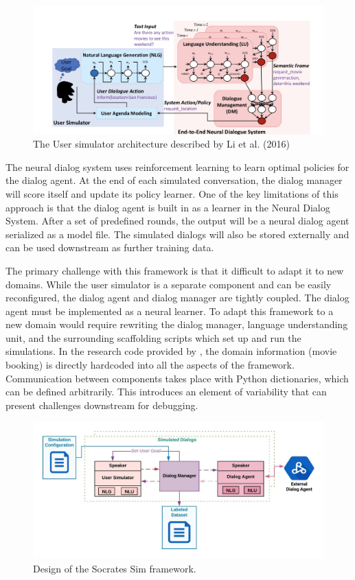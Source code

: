 \begin{figure}[h!]
	\label{fig:li_end_end}
	\includegraphics[width=\linewidth]{diagrams/li_end_to_end.jpeg}
	\caption{ The User simulator architecture described by Li et al. (2016) }
\end{figure}

The neural dialog system uses reinforcement learning to learn optimal policies for the dialog agent. At the end of each simulated conversation, the dialog manager will score itself and update its policy learner. One of the key limitations of this approach is that the dialog agent is built in as a learner in the Neural Dialog System. After a set of predefined rounds, the output will be a neural dialog agent serialized as a model file. The simulated dialogs will also be stored externally and can be used downstream as further training data.

The primary challenge with this framework is that it difficult to adapt it to new domains. While the user simulator is a separate component and can be easily reconfigured, the dialog agent and dialog manager are tightly coupled. The dialog agent must be implemented as a neural learner. To adapt this framework to a new domain would require rewriting the dialog manager, language understanding unit, and the surrounding scaffolding scripts which set up and run the simulations. In the research code provided by \cite{li_end_to_end}, the domain information (movie booking) is directly hardcoded into all the aspects of the framework. Communication between components takes place with Python dictionaries, which can be defined arbitrarily. This introduces an element of variability that can present challenges downstream for debugging.

\begin{figure}[h!]
	\label{fig:socrates_sim_framework}
	\includegraphics[width=\linewidth]{diagrams/socrates_diagram.jpeg}
	\caption{ Design of the Socrates Sim framework. }
\end{figure}

